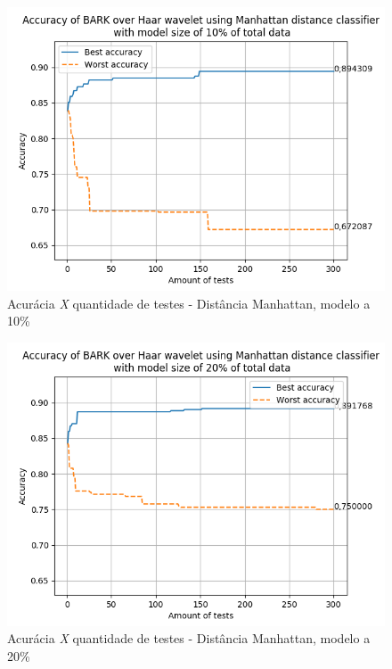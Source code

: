 \begin{myenv}{1.5}
		\newpage
		\begin{figure}[h]
			\centering
			\includegraphics{images/results/confusionMatrices/classifier_Manhattan_10.png}
			\caption{Acurácia \textit{X} quantidade de testes - Distância Manhattan, modelo a 10\%}
			\label{fig:classifiermanhattan10}
		\end{figure}
		
	
		\newpage
		\begin{figure}[h]
			\centering
			\includegraphics{images/results/confusionMatrices/classifier_Manhattan_20.png}
			\caption{Acurácia \textit{X} quantidade de testes - Distância Manhattan, modelo a 20\%}
			\label{fig:classifiermanhattan20}
		\end{figure}
		


\end{myenv}
